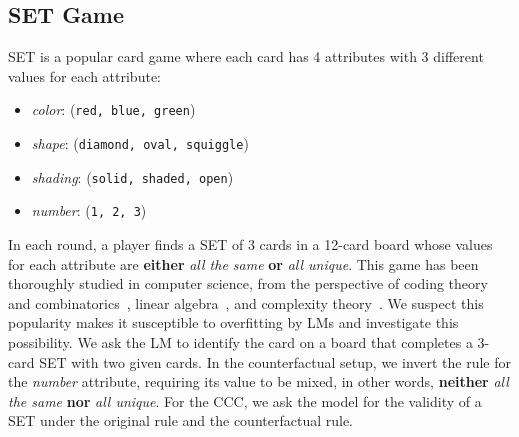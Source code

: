 \vspace{-1mm}
\subsection{SET Game} \label{sec:set-setup}
\vspace{-1mm}
SET is a popular card game where each card has 4 attributes with 3 different values for each  attribute:
\begin{itemize}
    \item \emph{color}: (\texttt{red, blue, green})
    \item \emph{shape}: (\texttt{diamond, oval, squiggle})
    \item \emph{shading}: (\texttt{solid, shaded, open})
    \item \emph{number}: (\texttt{1, 2, 3})
\end{itemize}
In each round, a player finds a SET of 3 cards in a 12-card board whose values for each attribute are \textbf{either} \emph{all the same} \textbf{or} \emph{all unique}. This game has been thoroughly studied in computer science, from the perspective of coding theory and combinatorics~\citep{davis2003card}, linear algebra~\citep{coleman2012game}, and complexity theory~\citep{Chaudhuri2003ONTC}. We suspect this popularity makes it susceptible to overfitting by LMs and investigate this possibility.
We ask the LM to identify the card on a board that completes a 3-card SET with two given cards.
In the counterfactual setup, we invert the rule for the \emph{number} attribute, requiring its value to be mixed, in other words, \textbf{neither} \emph{all the same} \textbf{nor} \emph{all unique}.
For the CCC, we ask the model for the validity of a SET under the original rule and the counterfactual rule.

